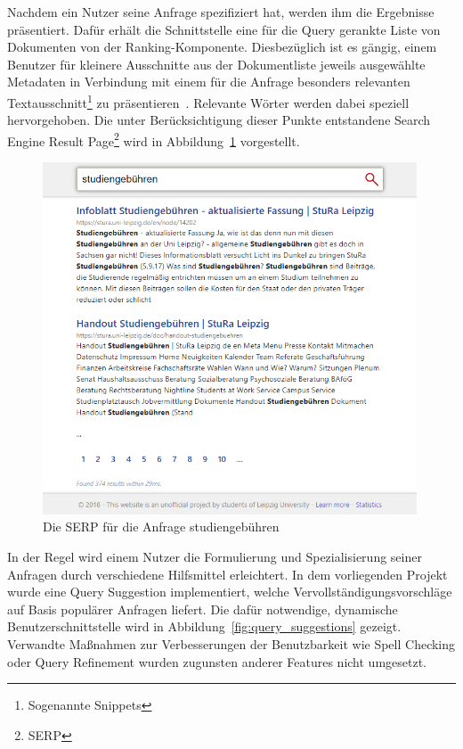 Nachdem ein Nutzer seine Anfrage spezifiziert hat, werden ihm die Ergebnisse präsentiert.
Dafür erhält die Schnittstelle eine für die Query gerankte Liste von Dokumenten von der Ranking-Komponente.
Diesbezüglich ist es gängig, einem Benutzer für kleinere Ausschnitte aus der Dokumentliste jeweils 
ausgewählte Metadaten in Verbindung mit einem 
für die Anfrage besonders relevanten Textausschnitt\footnote{Sogenannte Snippets} zu präsentieren~\cite{baeza_yates.search_interfaces}.
Relevante Wörter werden dabei speziell hervorgehoben.
Die unter Berücksichtigung dieser Punkte entstandene Search Engine Result Page\footnote{SERP} wird in Abbildung~\ref{fig:serp} vorgestellt.

\begin{figure}[!ht]
	\includegraphics[width=0.99\textwidth]{chapter_query_processing/serp.png}
	\caption{Die SERP für die Anfrage \glqq studiengebühren\grqq}
	\label{fig:serp}
\end{figure}

In der Regel wird einem Nutzer die Formulierung und Spezialisierung seiner Anfragen durch verschiedene Hilfsmittel
erleichtert.
In dem vorliegenden Projekt wurde eine Query Suggestion implementiert,
welche Vervollständigungsvorschläge auf Basis populärer Anfragen liefert.
Die dafür notwendige, dynamische Benutzerschnittstelle wird in Abbildung~\ref{fig:query_suggestions} gezeigt.
Verwandte Maßnahmen zur Verbesserungen der Benutzbarkeit wie Spell Checking oder Query Refinement 
wurden zugunsten anderer Features nicht umgesetzt.

